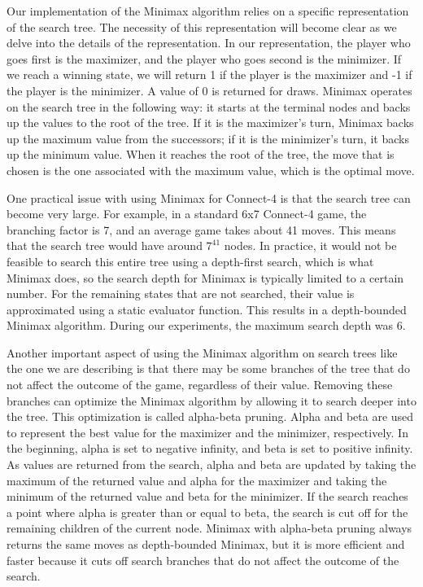 \documentclass[11pt]{article}
\begin{document}
Our implementation of the Minimax algorithm relies on a specific representation of the search tree. 
The necessity of this representation will become clear as we delve into the details of the representation. 
In our representation, the player who goes first is the maximizer, and the player who goes second is the minimizer. 
If we reach a winning state, we will return 1 if the player is the maximizer and -1 if the player is the minimizer. 
A value of 0 is returned for draws. Minimax operates on the search tree in the following way: 
it starts at the terminal nodes and backs up the values to the root of the tree. 
If it is the maximizer's turn, Minimax backs up the maximum value from the successors; 
if it is the minimizer's turn, it backs up the minimum value. When it reaches the root of the tree, 
the move that is chosen is the one associated with the maximum value, which is the optimal move.

One practical issue with using Minimax for Connect-4 is that the search tree can become very large. 
For example, in a standard 6x7 Connect-4 game, the branching factor is 7, and an average game takes 
about 41 moves\cite{Victor}. This means that the search tree would have around $7^{41}$ nodes. 
In practice, it would not be feasible to search this entire tree using a depth-first search, which is what
Minimax does, so the search depth for Minimax is typically limited to a certain number. 
For the remaining states that are not searched, their value is approximated using a static evaluator function. 
This results in a depth-bounded Minimax algorithm. During our experiments, the maximum search depth was 6.

Another important aspect of using the Minimax algorithm on search trees like the one we are describing
is that there may be some branches of the tree that do not affect the outcome of the game, 
regardless of their value. Removing these branches can optimize the Minimax algorithm by allowing it 
to search deeper into the tree. This optimization is called alpha-beta pruning. Alpha and beta are used to 
represent the best value for the maximizer and the minimizer, respectively. In the beginning, alpha is set 
to negative infinity, and beta is set to positive infinity. As values are returned from the search, 
alpha and beta are updated by taking the maximum of the returned value and alpha for the maximizer 
and taking the minimum of the returned value and beta for the minimizer. If the search reaches a point 
where alpha is greater than or equal to beta, the search is cut off for the remaining children of 
the current node. Minimax with alpha-beta pruning always returns the same moves as depth-bounded Minimax, 
but it is more efficient and faster because it cuts off search branches that do not affect the outcome of the search.
\end{document}
